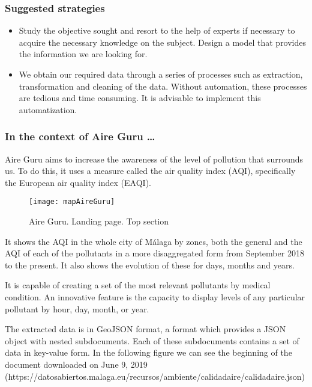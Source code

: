 \subsubsection*{Suggested strategies} 

\begin{itemize}
    \item Study the objective sought and resort to the help of experts if necessary to acquire the necessary knowledge on the subject.
    Design a model that provides the information we are looking for.

    \item We obtain our required data through a series of processes such as extraction, transformation and cleaning of the data.
    Without automation, these processes are tedious and time consuming.
    It is advisable to implement this automatization.
\end{itemize}

\subsubsection*{In the context of Aire Guru \ldots} 

Aire Guru aims to increase the awareness of the level of pollution that surrounds us.
To do this, it uses a measure called the air quality index (AQI), specifically the European air quality index (EAQI).

\begin{figure}[ht]
    \centering
    \texttt{[image: mapAireGuru]}
    \caption{Aire Guru. Landing page. Top section}
\end{figure}

It shows the AQI in the whole city of Málaga by zones, both the general and the AQI of each of the pollutants in a more disaggregated form from September 2018 to the present.
It also shows the evolution of these for days, months and years.

It is capable of creating a set of the most relevant pollutants by medical condition.
An innovative feature is the capacity to display levels of any particular pollutant by hour, day, month, or year. 

The extracted data is in GeoJSON format, a format which provides a JSON object with nested subdocuments.
Each of these subdocuments contains a set of data in key-value form.
In the following figure we can see the beginning of the document downloaded on June 9, 2019 (https://datosabiertos.malaga.eu/recursos/ambiente/calidadaire/calidadaire.json) \\

